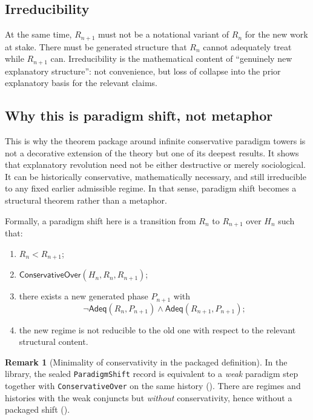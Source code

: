 \documentclass[11pt,a4paper]{article}
\theoremstyle{definition}
\newtheorem{remark}[theorem]{Remark}
\newcommand{\Adeq}{\mathsf{Adeq}}
\newcommand{\ConservativeOver}{\mathsf{ConservativeOver}}
\begin{document}
\subsection{Irreducibility}

At the same time, $R_{n+1}$ must not be a notational variant of $R_n$ for the new work at stake. There must be generated structure that $R_n$ cannot adequately treat while $R_{n+1}$ can. Irreducibility is the mathematical content of ``genuinely new explanatory structure'': not convenience, but loss of collapse into the prior explanatory basis for the relevant claims.

\subsection{Why this is paradigm shift, not metaphor}

This is why the theorem package around infinite conservative paradigm towers is not a decorative extension of the theory but one of its deepest results. It shows that explanatory revolution need not be either destructive or merely sociological. It can be historically conservative, mathematically necessary, and still irreducible to any fixed earlier admissible regime. In that sense, paradigm shift becomes a structural theorem rather than a metaphor.

\medskip
\noindent
Formally, a paradigm shift here is a transition from $R_n$ to $R_{n+1}$ over $H_n$ such that:
\begin{enumerate}[leftmargin=2em]
\item $R_n < R_{n+1}$;
\item $\ConservativeOver(H_n,R_n,R_{n+1})$;
\item there exists a new generated phase $P_{n+1}$ with
\[
\neg \Adeq(R_n,P_{n+1}) \wedge \Adeq(R_{n+1},P_{n+1});
\]
\item the new regime is not reducible to the old one with respect to the relevant structural content.
\end{enumerate}

\begin{remark}[Minimality of conservativity in the packaged definition]
In the library, the sealed \texttt{ParadigmShift} record is equivalent to a \emph{weak} paradigm step together with
\texttt{ConservativeOver} on the same history ().
There are regimes and histories with the weak conjuncts but \emph{without} conservativity, hence without a packaged shift
().
\end{remark}
\end{document}
